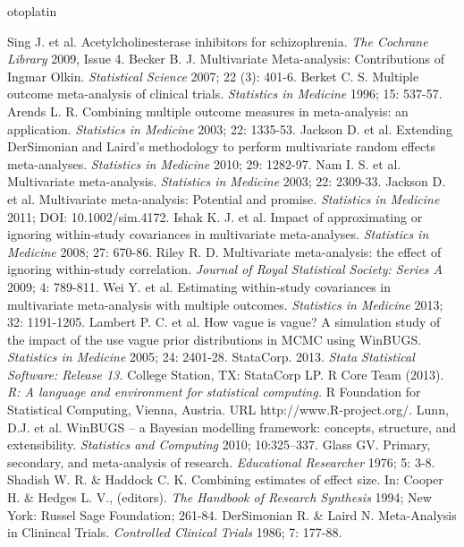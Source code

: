 otoplatin\documentclass[a4paper,openright,12pt]{report}
\begin{document}
\begin{thebibliography}{99}
 Sing J. et al. Acetylcholinesterase inhibitors for schizophrenia. \textit{The Cochrane Library} 2009, Issue 4.
 Becker B. J. Multivariate Meta-analysis: Contributions of Ingmar Olkin. \textit{Statistical Science} 2007; 22 (3): 401-6.
 Berket C. S. Multiple outcome meta-analysis of clinical trials. \textit{Statistics in Medicine} 1996; 15: 537-57.
 Arends L. R. Combining multiple outcome measures in meta-analysis: an application. \textit{Statistics in Medicine} 2003; 22: 1335-53.
 Jackson D. et al. Extending DerSimonian and Laird's methodology to perform multivariate random effects meta-analyses. \textit{Statistics in Medicine} 2010; 29: 1282-97.
 Nam I. S. et al. Multivariate meta-analysis. \textit{Statistics in Medicine} 2003; 22: 2309-33.
 Jackson D. et al. Multivariate meta-analysis: Potential and promise. \textit{Statistics in Medicine} 2011; DOI: 10.1002/sim.4172.
 Ishak K. J. et al. Impact of approximating or ignoring within-study covariances in multivariate meta-analyses. \textit{Statistics in Medicine} 2008; 27: 670-86.
 Riley R. D. Multivariate meta-analysis: the effect of ignoring within-study correlation. \textit{Journal of Royal Statistical Society: Series A} 2009; 4: 789-811.
 Wei Y. et al. Estimating within-study covariances in multivariate meta-analysis with multiple outcomes. \textit{Statistics in Medicine} 2013; 32: 1191-1205. 
 Lambert P. C. et al. How vague is vague? A simulation study of the impact of the use vague prior distributions in MCMC using WinBUGS. \textit{Statistics in Medicine} 2005; 24: 2401-28.
 StataCorp. 2013. \textit{Stata Statistical Software: Release 13.} College Station, TX: StataCorp LP.
 R Core Team (2013). \textit{R: A language and environment for statistical computing.} R Foundation for Statistical Computing, Vienna, Austria. URL http://www.R-project.org/.
 Lunn, D.J. et al. WinBUGS -- a Bayesian modelling framework: concepts, structure, and extensibility. \textit{Statistics and Computing} 2010; 10:325--337.
 Glass GV. Primary, secondary, and meta-analysis of research. \textit{Educational Researcher} 1976; 5: 3-8.
 Shadish W. R. \& Haddock C. K. Combining estimates of effect size. In: Cooper H. \& Hedges L. V., (editors). \textit{The Handbook of Research Synthesis} 1994; New York: Russel Sage Foundation; 261-84.
 DerSimonian R. \& Laird N. Meta-Analysis in Clinincal Trials. \textit{Controlled Clinical Trials} 1986; 7: 177-88.

\end{thebibliography}
\end{document}
